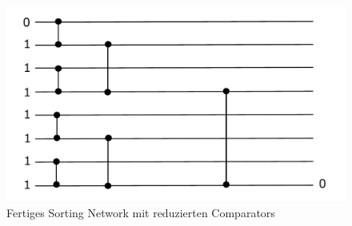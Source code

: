 \documentclass[a4,abstract=on]{scrartcl}
\newcommand*\stdsection{}
\let\stdsection\section
\renewcommand*\section{%
    \clearpage\ifodd\value{page}\else\mbox{}\clearpage\fi
    \stdsection}
\begin{document}
\begin{figure}[H]
\centering
\includegraphics[width=\textwidth]{ownSorting_end.pdf}
\caption{Fertiges Sorting Network mit reduzierten Comparators}
\label{fig:ownSortingEnd}
\end{figure}


%
%
\end{document}
